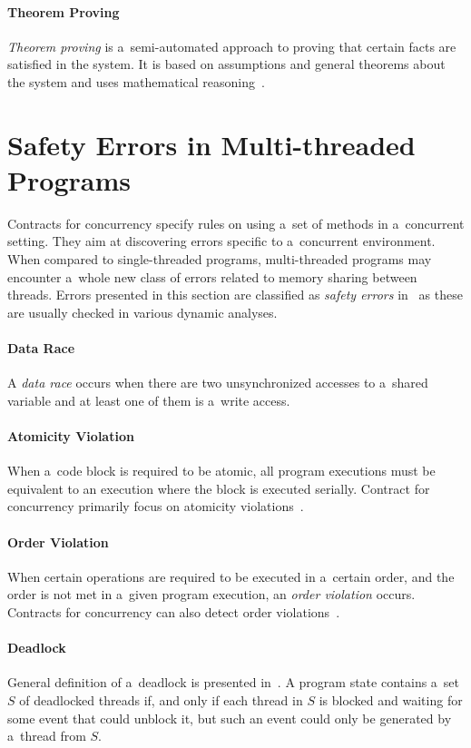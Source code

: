 \paragraph{Theorem Proving}
\emph{Theorem proving} is a~semi-automated approach to proving that certain
facts are satisfied in the system. It is based on assumptions and general
theorems about the system and uses mathematical reasoning~\cite{fundamentals}.


\section{Safety Errors in Multi-threaded Programs}

Contracts for concurrency specify rules on using a~set of methods in
a~concurrent setting. They aim at discovering errors specific to a~concurrent
environment. When compared to single-threaded programs, multi-threaded programs
may encounter a~whole new class of errors related to memory sharing between
threads. Errors presented in this section are classified as \emph{safety errors}
in~\cite{letko} as these are usually checked in various dynamic analyses.

\paragraph{Data Race}
A \emph{data race} occurs when there are two unsynchronized accesses to a~shared
variable and at least one of them is a~write access.

\paragraph{Atomicity Violation}
When a~code block is required to be atomic, all program executions must be
equivalent to an execution where the block is executed serially. Contract for
concurrency primarily focus on atomicity violations~\cite{contracts}.

\paragraph{Order Violation}
When certain operations are required to be executed
in a~certain order, and the order is not met in a~given program execution, an
\emph{order violation} occurs. Contracts for concurrency can also detect order
violations~\cite{contracts}.

\paragraph{Deadlock}
General definition of a~deadlock is presented in~\cite{letko}. A program state
contains a~set $S$ of deadlocked threads if, and only if each thread in $S$ is
blocked and waiting for some event that could unblock it, but such an event
could only be generated by a~thread from $S$.

